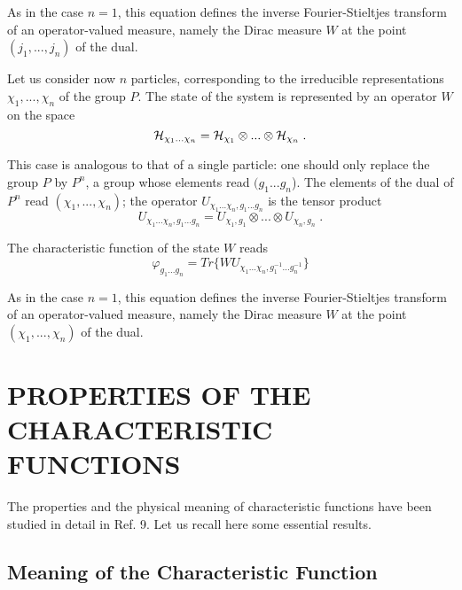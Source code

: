 \documentclass[a4paper,11pt]{article}
\begin{document}
As in the case $n=1$, this equation defines the inverse Fourier-Stieltjes transform of an 
operator-valued measure, namely the Dirac measure $W$ at the point $(j_1,...,j_n)$ of the dual. 

Let us consider now $n$ particles, corresponding to the irreducible representations 
$\chi_1, ... ,\chi_n$ 
of the group $P$. The state of the system is represented by an operator $W$ on the space
$$
   \mathcal{H}_{\chi_1 ... \chi_n} = \mathcal{H}_{\chi_1}\otimes ... \otimes \mathcal{H}_{\chi_n} \; .
$$ 

This case is analogous to that of a single particle: one should only replace the group $P$ by 
$P^n$, 
a group whose elements read $(g_1...g_n$). The elements of the dual of $P^n$ read 
$(\chi_1, ...,\chi_n)$; the operator $U_{\chi_1 ... \chi_n,g_1 ... g_n}$ is the tensor 
product
\begin{equation}
 \label{eq.4.3}
   U_{\chi_1 ... \chi_n,g_1 ... g_n} = U_{\chi_1,g_1} \otimes ... \otimes U_{\chi_n,g_n}  \; .
\end{equation}

The characteristic function of the state $W$ reads
\begin{equation}
 \label{eq.4.4}
    \varphi_{g_1 ... g_n} = Tr \{ W  U_{\chi_1 ... \chi_n,g_1^{-1} ... g_n^{-1}} \}
\end{equation}

As in the case $n=1$, this equation defines the inverse Fourier-Stieltjes transform of an 
operator-valued measure, namely the Dirac measure $W$ at the point $(\chi_1, ... ,\chi_n)$ of 
the dual.

\section{PROPERTIES OF THE CHARACTERISTIC FUNCTIONS}

The properties and the physical meaning of characteristic functions have been studied in detail 
in Ref. 9. Let us recall here some essential results.

\subsection{Meaning of the Characteristic Function}
\end{document}
